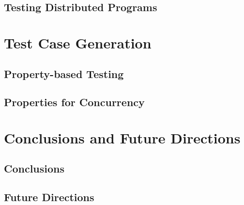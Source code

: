 \documentclass[openright,imperial,11pt]{octavo}
\begin{document}
\chapter{Testing Distributed Programs}
\blindtext

\part{Test Case Generation}

\chapter{Property-based Testing}
\blindtext

\chapter{Properties for Concurrency}
\blindtext

\part{Conclusions and Future Directions}

\chapter{Conclusions}
\blindtext

\chapter{Future Directions}
\blindtext

\begin{appendices}
\end{appendices}



\end{document}
